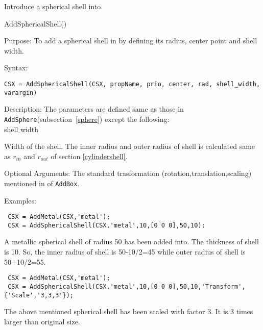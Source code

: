 Introduce a spherical shell into\hyperref[CSX]{}. 

\begin{FontNameFunct}{AddSphericalShell()}
\end{FontNameFunct}

\begin{FontDescr}{Purpose:}
To add a spherical shell in\hyperref[CSX]{} by defining its radius, center point and shell width. 
\end{FontDescr}

\begin{FontDescr}{Syntax:}
\begin{lstlisting}
CSX = AddSphericalShell(CSX, propName, prio, center, rad, shell_width, varargin) 
\end{lstlisting}
\end{FontDescr}

\begin{FontDescr}{Description:}
The parameters are defined same as those in \texttt{AddSphere}(subsection~\ref{sphere}) except the following: \\
\textcolor{varcol}{shell$\_$width}
\begin{myindentpar} Width of the shell. The inner radius and outer radius of shell is calculated same as \hyperref[rin]{$r_{in}$} and \hyperref[rout]{$r_{out}$} of section \ref{cylindershell}.
\end{myindentpar} 
\end{FontDescr}

\begin{FontDescr}{Optional Arguments:}
The standard trasformation (rotation,translation,scaling) mentioned in  \hyperref[prim_transform]{} of \texttt{AddBox}.   
\end{FontDescr}

\begin{FontDescr}{Examples:}

\begin{lstlisting} 
 CSX = AddMetal(CSX,'metal'); 
 CSX = AddSphericalShell(CSX,'metal',10,[0 0 0],50,10);
\end{lstlisting}
A metallic spherical shell of radius 50 has been added into\hyperref[CSX]{}. The thickness of shell is 10. So, the inner radius of shell is 50-10/2=45 while outer radius of shell is 50+10/2=55.   

\begin{lstlisting} 
 CSX = AddMetal(CSX,'metal'); 
 CSX = AddSphericalShell(CSX,'metal',10,[0 0 0],50,10,'Transform',{'Scale','3,3,3'});
\end{lstlisting}
The above mentioned spherical shell has been scaled with factor 3. It is 3 times larger than original size. 

\end{FontDescr}